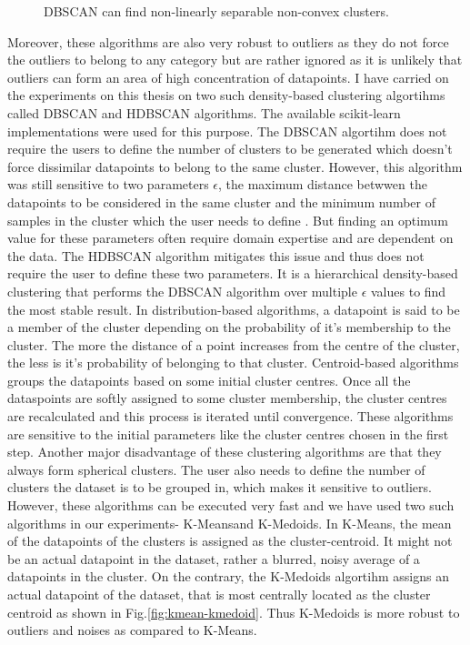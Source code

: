 {\begin{figure}[t]
    \caption{\ac{DBSCAN} can find non-linearly separable non-convex clusters.\cite{dbscanWiki}}
    \label{fig:dbscan}
\end{figure} 
Moreover, these algorithms are also very robust to outliers as they do not force the outliers to belong to any category but are rather ignored as it is unlikely that outliers can form an area of high concentration of datapoints. I have carried on the experiments on this thesis on two such density-based clustering algortihms called \ac{DBSCAN}\cite*{dbscan} and \ac{HDBSCAN} algorithms\cite*{hdbscan}. The available scikit-learn implementations were used for this purpose\cite*{scikit-learn}. The \ac{DBSCAN}\cite*{dbscan} algortihm  does not require the users to define the number of clusters to be generated which doesn't force dissimilar datapoints to belong to the same cluster. However, this algorithm was still sensitive to two parameters $\epsilon$, the maximum distance betwwen the datapoints to be considered in the same cluster and the minimum number of samples in the cluster which the user needs to define \cite*{scikit-learn}. But finding an optimum value for these parameters often require domain expertise and are dependent on the data. The \ac{HDBSCAN}\cite*{hdbscan} algorithm mitigates this issue and thus does not require the user to define these two parameters. It is a hierarchical density-based clustering that performs the \ac{DBSCAN} algorithm over multiple $\epsilon$ values to find the most stable result. In distribution-based algorithms, a datapoint is said to be a member of the cluster depending on the probability of it's membership to the cluster. The more the distance of a point increases from the centre of the cluster, the less is it's probability of belonging to that cluster. Centroid-based algorithms groups the datapoints based on some initial cluster centres. Once all the dataspoints are softly assigned to some cluster membership, the cluster centres are recalculated and this process is iterated until convergence. These algorithms are sensitive to the initial parameters like the cluster centres chosen in the first step. Another major disadvantage of these clustering algorithms are that they always form spherical clusters. The user also needs to define the number of clusters the dataset is to be grouped in, which makes it sensitive to outliers. However, these algorithms can be executed very fast and we have used two such algorithms in our experiments- K-Means\cite*{kmeans}and K-Medoids\cite*{kmedoids}. In K-Means, the mean of the datapoints of the clusters is assigned as the cluster-centroid. It might not be an actual datapoint in the dataset, rather a blurred, noisy average of a datapoints in the cluster. On the contrary, the K-Medoids algortihm assigns an actual datapoint of the dataset, that is most centrally located as the cluster centroid as shown in Fig.\ref*{fig:kmean-kmedoid}. Thus K-Medoids is more robust to outliers and noises as compared to K-Means.

}
